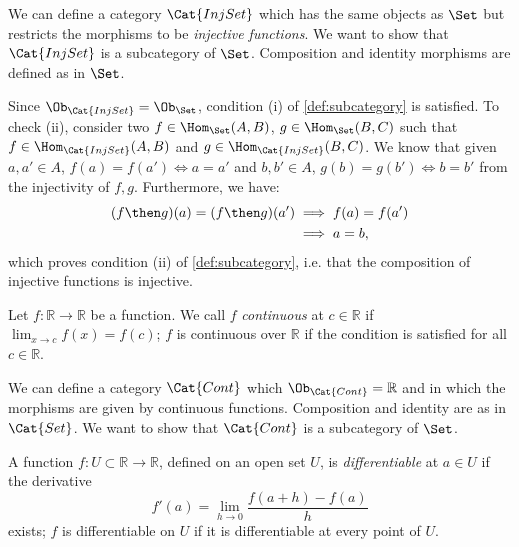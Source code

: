 \begin{example}
We can define a category $\Cat{InjSet}$ which has the same objects as $\Set$ but restricts the morphisms to be \emph{injective functions}.
We want to show that $\Cat{InjSet}$ is a subcategory of $\Set$. Composition and identity morphisms are defined as in $\Set$.

Since $\Ob_{\Cat{InjSet}}=\Ob_{\Set}$, condition (i) of \cref{def:subcategory} is satisfied. To check (ii), consider two $f\in \Hom_\Set(A,B)$, $g\in \Hom_\Set(B,C)$ such that $f\in \Hom_\Cat{InjSet}(A,B)$ and $g\in \Hom_\Cat{InjSet}(B,C)$. We know that given $a,a'\in A$, $f(a)=f(a') \Leftrightarrow a=a'$ and $b,b'\in A$, $g(b)=g(b') \Leftrightarrow b=b'$ from the injectivity of $f,g$. Furthermore, we have:
\begin{equation*}
    \begin{aligned}
    (f\then g)(a)=(f\then g)(a')&\implies f(a)=f(a')\\
    &\implies a=b,
    \end{aligned}
\end{equation*}
which proves condition (ii) of \cref{def:subcategory}, i.e. that the composition of injective functions is injective.
\end{example}




\begin{definition}
Let $f\colon \mathbb{R}\to \mathbb{R}$ be a function. We call $f$ \emph{continuous} at $c\in \mathbb{R}$ if $\lim_{x\to c}f(x)=f(c)$; $f$ is continuous over $\mathbb{R}$ if the condition is satisfied for all $c\in \mathbb{R}$.

\begin{example}
We can define a category $\Cat{Cont}$ which $\Ob_\Cat{Cont}=\mathbb{R}$ and in which the morphisms are given by continuous functions. Composition and identity are as in $\Cat{Set}$.  We want to show that $\Cat{Cont}$ is a subcategory of $\Set$.
\end{example}
\end{definition}

\begin{definition}
A function $f\colon U\subset \mathbb{R}\to \mathbb{R}$, defined on an open set $U$, is \emph{differentiable} at $a\in U$ if the derivative
\begin{equation}
    f'(a)=\lim_{h\to 0} \frac{f(a+h)-f(a)}{h}
\end{equation}
exists; $f$ is differentiable on $U$ if it is differentiable at every point of $U$.
\end{definition}

